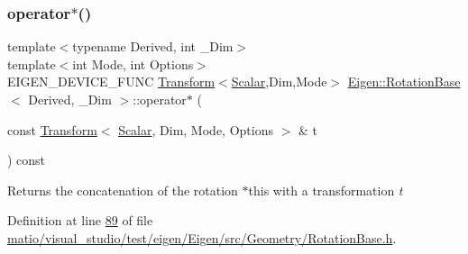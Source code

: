 \mbox{\label{class_eigen_1_1_rotation_base_adf1097a616f0ebf7e78eea9598697672}} 
\subsubsection{\texorpdfstring{operator$\ast$()}{operator*()}\hspace{0.1cm}{\footnotesize\ttfamily [7/8]}}
{\footnotesize\ttfamily template$<$typename Derived, int \+\_\+\+Dim$>$ \\
template$<$int Mode, int Options$>$ \\
E\+I\+G\+E\+N\+\_\+\+D\+E\+V\+I\+C\+E\+\_\+\+F\+U\+NC \hyperlink{group___geometry___module_class_eigen_1_1_transform}{Transform}$<$\hyperlink{class_eigen_1_1_rotation_base_af9b43eac462d7aa70b018efd49c13ef4}{Scalar},Dim,Mode$>$ \hyperlink{class_eigen_1_1_rotation_base}{Eigen\+::\+Rotation\+Base}$<$ Derived, \+\_\+\+Dim $>$\+::operator$\ast$ (\begin{DoxyParamCaption}\item[{const \hyperlink{group___geometry___module_class_eigen_1_1_transform}{Transform}$<$ \hyperlink{class_eigen_1_1_rotation_base_af9b43eac462d7aa70b018efd49c13ef4}{Scalar}, Dim, Mode, Options $>$ \&}]{t }\end{DoxyParamCaption}) const\hspace{0.3cm}{\ttfamily [inline]}}

\begin{DoxyReturn}{Returns}
the concatenation of the rotation {\ttfamily $\ast$this} with a transformation {\itshape t} 
\end{DoxyReturn}


Definition at line \hyperlink{matio_2visual__studio_2test_2eigen_2_eigen_2src_2_geometry_2_rotation_base_8h_source_l00089}{89} of file \hyperlink{matio_2visual__studio_2test_2eigen_2_eigen_2src_2_geometry_2_rotation_base_8h_source}{matio/visual\+\_\+studio/test/eigen/\+Eigen/src/\+Geometry/\+Rotation\+Base.\+h}.

\mbox{\label{class_eigen_1_1_rotation_base_adf1097a616f0ebf7e78eea9598697672}} 
